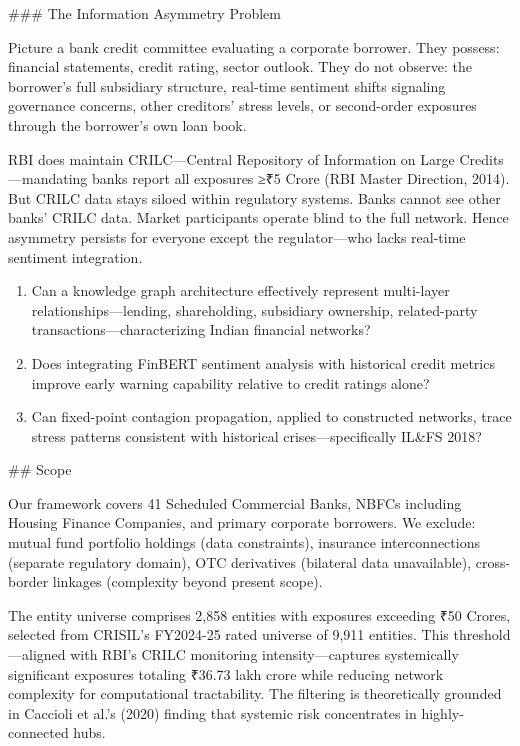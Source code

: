 \documentclass[12pt]{article}
\begin{document}
### The Information Asymmetry Problem

Picture a bank credit committee evaluating a corporate borrower. They possess: financial statements, credit rating, sector outlook. They do not observe: the borrower's full subsidiary structure, real-time sentiment shifts signaling governance concerns, other creditors' stress levels, or second-order exposures through the borrower's own loan book.

RBI does maintain CRILC—Central Repository of Information on Large Credits—mandating banks report all exposures ≥₹5 Crore (RBI Master Direction, 2014). But CRILC data stays siloed within regulatory systems. Banks cannot see other banks' CRILC data. Market participants operate blind to the full network. Hence asymmetry persists for everyone except the regulator—who lacks real-time sentiment integration.

\begin{enumerate}
\item Can a knowledge graph architecture effectively represent multi-layer relationships—lending, shareholding, subsidiary ownership, related-party transactions—characterizing Indian financial networks?
\item Does integrating FinBERT sentiment analysis with historical credit metrics improve early warning capability relative to credit ratings alone?
\item Can fixed-point contagion propagation, applied to constructed networks, trace stress patterns consistent with historical crises—specifically IL&FS 2018?
\end{enumerate}

## Scope

Our framework covers 41 Scheduled Commercial Banks, NBFCs including Housing Finance Companies, and primary corporate borrowers. We exclude: mutual fund portfolio holdings (data constraints), insurance interconnections (separate regulatory domain), OTC derivatives (bilateral data unavailable), cross-border linkages (complexity beyond present scope).

The entity universe comprises 2,858 entities with exposures exceeding ₹50 Crores, selected from CRISIL's FY2024-25 rated universe of 9,911 entities. This threshold—aligned with RBI's CRILC monitoring intensity—captures systemically significant exposures totaling ₹36.73 lakh crore while reducing network complexity for computational tractability. The filtering is theoretically grounded in Caccioli et al.'s (2020) finding that systemic risk concentrates in highly-connected hubs.
\end{document}
